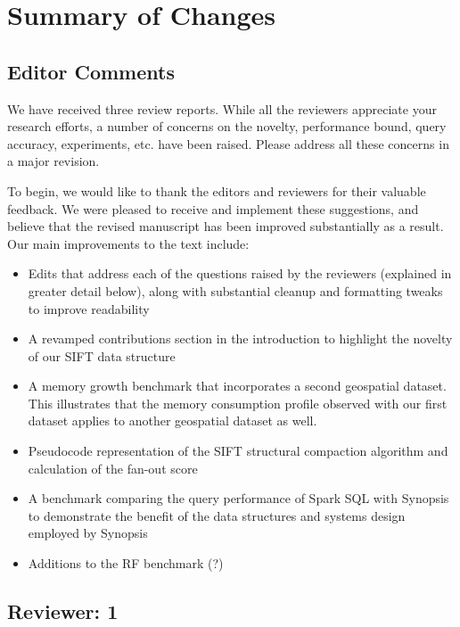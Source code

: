 \documentclass{article}
\begin{document}
\section*{Summary of Changes}\label{summary-of-changes}
\subsection*{Editor Comments}\label{editor-comments}

We have received three review reports. While all the reviewers
appreciate your research efforts, a number of concerns on the novelty,
performance bound, query accuracy, experiments, etc. have been raised.
Please address all these concerns in a major revision.

\begin{tcolorbox}
To begin, we would like to thank the editors and reviewers for their
valuable feedback. We were pleased to receive and implement these
suggestions, and believe that the revised manuscript has been improved
substantially as a result. Our main improvements to the text include:

\begin{itemize}
\item
  Edits that address each of the questions raised by the reviewers
  (explained in greater detail below), along with substantial cleanup
  and formatting tweaks to improve readability
\item
  A revamped contributions section in the introduction to highlight the
  novelty of our SIFT data structure
\item
  A memory growth benchmark that incorporates a second geospatial
  dataset. This illustrates that the memory consumption profile observed
  with our first dataset applies to another geospatial dataset as well.
\item
  Pseudocode representation of the SIFT structural compaction algorithm
  and calculation of the fan-out score
\item
  A benchmark comparing the query performance of Spark SQL with Synopsis
  to demonstrate the benefit of the data structures and systems design
  employed by Synopsis
\item
  Additions to the RF benchmark (?)
\end{itemize}
\end{tcolorbox}

\subsection*{Reviewer: 1}\label{reviewer-1}
\end{document}
